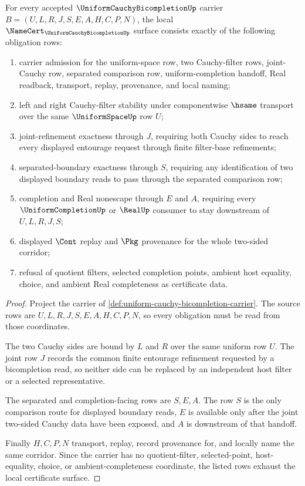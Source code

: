 \begin{theorem}
\label{thm:uniform-cauchy-bicompletion-namecert-obligations}
For every accepted $\UniformCauchyBicompletionUp$ carrier $B=(U,L,R,J,S,E,A,H,C,P,N)$, the local $\NameCert_{\UniformCauchyBicompletionUp}$ surface consists exactly of the following obligation rows:
\begin{enumerate}
\item carrier admission for the uniform-space row, two Cauchy-filter rows, joint-Cauchy row, separated comparison row, uniform-completion handoff, Real readback, transport, replay, provenance, and local naming;
\item left and right Cauchy-filter stability under componentwise $\hsame$ transport over the same $\UniformSpaceUp$ row $U$;
\item joint-refinement exactness through $J$, requiring both Cauchy sides to reach every displayed entourage request through finite filter-base refinements;
\item separated-boundary exactness through $S$, requiring any identification of two displayed boundary reads to pass through the separated comparison row;
\item completion and Real nonescape through $E$ and $A$, requiring every $\UniformCompletionUp$ or $\RealUp$ consumer to stay downstream of $U,L,R,J,S$;
\item displayed $\Cont$ replay and $\Pkg$ provenance for the whole two-sided corridor;
\item refusal of quotient filters, selected completion points, ambient host equality, choice, and ambient Real completeness as certificate data.
\end{enumerate}
\end{theorem}
\begin{proof}
Project the carrier of \autoref{def:uniform-cauchy-bicompletion-carrier}. The source rows are $U,L,R,J,S,E,A,H,C,P,N$, so every obligation must be read from those coordinates.

The two Cauchy sides are bound by $L$ and $R$ over the same uniform row $U$. The joint row $J$ records the common finite entourage refinement requested by a bicompletion read, so neither side can be replaced by an independent host filter or a selected representative.

The separated and completion-facing rows are $S,E,A$. The row $S$ is the only comparison route for displayed boundary reads, $E$ is available only after the joint two-sided Cauchy data have been exposed, and $A$ is downstream of that handoff.

Finally $H,C,P,N$ transport, replay, record provenance for, and locally name the same corridor. Since the carrier has no quotient-filter, selected-point, host-equality, choice, or ambient-completeness coordinate, the listed rows exhaust the local certificate surface.
\end{proof}

